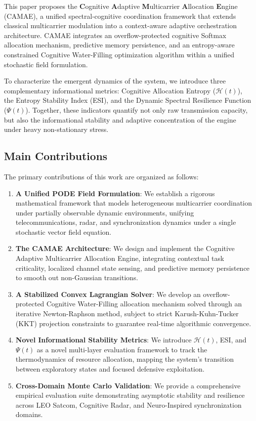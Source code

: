\documentclass[journal,10pt,twocolumn,twoside]{IEEEtran}
\newcommand{\hH}{\mathcal{H}}
\newcommand{\hPsi}{\Psi}
\begin{document}
This paper proposes the \textbf{C}ognitive \textbf{A}daptive \textbf{M}ulticarrier \textbf{A}llocation \textbf{E}ngine (CAMAE), a unified spectral-cognitive coordination framework that extends classical multicarrier modulation into a context-aware adaptive orchestration architecture. CAMAE integrates an overflow-protected cognitive Softmax allocation mechanism, predictive memory persistence, and an entropy-aware constrained Cognitive Water-Filling optimization algorithm within a unified stochastic field formulation.

To characterize the emergent dynamics of the system, we introduce three complementary informational metrics: Cognitive Allocation Entropy ($\hH(t)$), the Entropy Stability Index (ESI), and the Dynamic Spectral Resilience Function ($\hPsi(t)$). Together, these indicators quantify not only raw transmission capacity, but also the informational stability and adaptive concentration of the engine under heavy non-stationary stress.

\subsection{Main Contributions}

The primary contributions of this work are organized as follows:
\begin{enumerate}
    \item \textbf{A Unified PODE Field Formulation}: We establish a rigorous mathematical framework that models heterogeneous multicarrier coordination under partially observable dynamic environments, unifying telecommunications, radar, and synchronization dynamics under a single stochastic vector field equation.
    \item \textbf{The CAMAE Architecture}: We design and implement the Cognitive Adaptive Multicarrier Allocation Engine, integrating contextual task criticality, localized channel state sensing, and predictive memory persistence to smooth out non-Gaussian transitions.
    \item \textbf{A Stabilized Convex Lagrangian Solver}: We develop an overflow-protected Cognitive Water-Filling allocation mechanism solved through an iterative Newton-Raphson method, subject to strict Karush-Kuhn-Tucker (KKT) projection constraints to guarantee real-time algorithmic convergence.
    \item \textbf{Novel Informational Stability Metrics}: We introduce $\hH(t)$, ESI, and $\hPsi(t)$ as a novel multi-layer evaluation framework to track the thermodynamics of resource allocation, mapping the system's transition between exploratory states and focused defensive exploitation.
    \item \textbf{Cross-Domain Monte Carlo Validation}: We provide a comprehensive empirical evaluation suite demonstrating asymptotic stability and resilience across LEO Satcom, Cognitive Radar, and Neuro-Inspired synchronization domains.
\end{enumerate}
\end{document}
